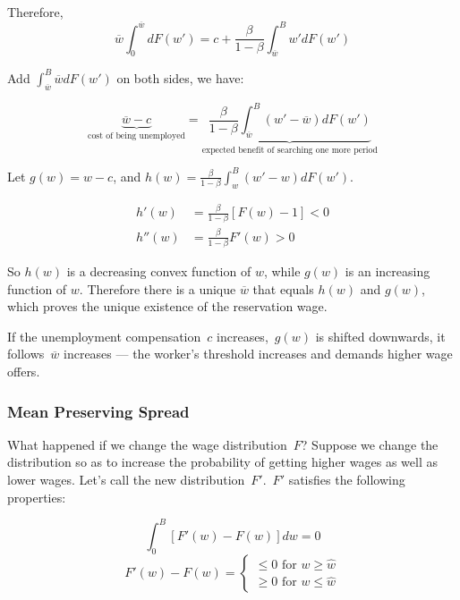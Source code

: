 \documentclass[10pt,a4]{article}
\begin{document}
Therefore, 
\[  
\overline{w}\int_0^{\overline{w}}dF(w') = c + \frac{\beta}{1-\beta}\int_{\overline{w}}^{B} w' dF(w')
\]

Add $\int_{\overline{w}}^{B} \overline{w} dF(w')$ on both sides, we have:

\begin{equation}
\label{eq:rw}
\underbrace{\overline{w} - c}_{\textrm{cost of being unemployed}} = \underbrace{\frac{\beta}{1-\beta}\int_{\overline{w}}^{B} (w'-\overline{w}) dF(w')}_{\textrm{expected benefit of searching one more period}} 
\end{equation}

Let $g(w) = w - c$, and $h(w) = \frac{\beta}{1-\beta}\int_{w}^{B} (w'-w) dF(w')$.

\[
\begin{aligned}
h'(w) &= \frac{\beta}{1-\beta}[F(w)-1] < 0 \\
h''(w) &= \frac{\beta}{1-\beta}F'(w) > 0
\end{aligned}
\]

So \(h\left(w\right)\) is a decreasing convex function of
\(w\), while \(g\left(w\right)\) is an increasing function
of \(w\). Therefore there is a unique \(\overline{w}\)
that equals \(h\left(w\right)\) and \(g\left(w\right)\), which proves the
unique existence of the reservation wage.

If the unemployment compensation~\(c\)
increases,~\(g\left(w\right)\) is shifted downwards, it
follows~\(\overline{w}\) increases --- the worker's threshold
increases and demands higher wage offers.~

\par\null

\subsubsection{Mean Preserving Spread}

{\label{613325}}

What happened if we change the wage distribution~\(F\)?
Suppose we change the distribution so as to increase the probability of
getting higher wages as well as lower wages. Let's call the new
distribution~\(F'\).~\(F'\) satisfies the
following properties:

$$\int_0^B[F'(w) - F(w)]dw = 0$$
$$ F'(w) - F(w) = 
          \begin{cases}
             \le 0 \textrm{ for } w \ge \hat w\\
             \ge 0 \textrm{ for } w \le \hat w
          \end{cases}
$$
\end{document}
